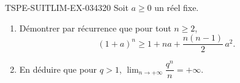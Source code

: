 \begin{exercice}{TSPE-SUITLIM-EX-034}{3}{20}
Soit $a \geq 0$ un réel fixe.
\begin{enumerate}
  \item Démontrer par récurrence que pour tout $n \geq 2$,
    \[
      (1+a)^n \geq 1 + na + \frac{n(n-1)}{2}\,a^2.
    \]
  \item En déduire que pour $q > 1$, $\lim_{n \to +\infty} \dfrac{q^n}{n} = +\infty$.
\end{enumerate}
\end{exercice}

